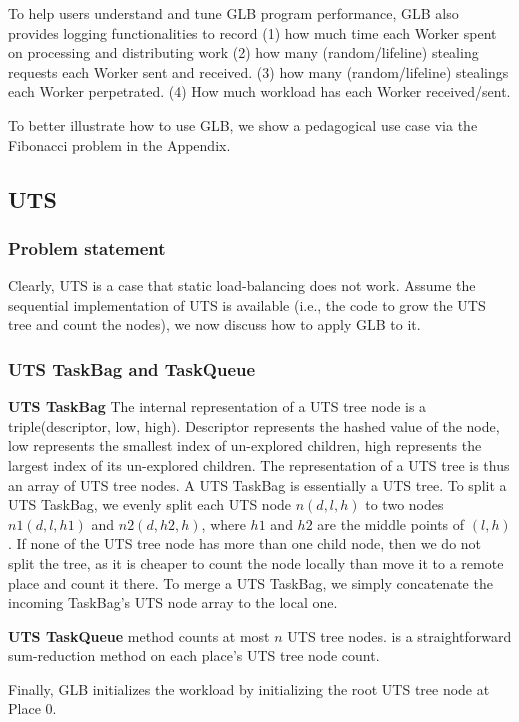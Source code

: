 To help users understand and tune GLB program performance, GLB also provides logging functionalities to record (1) how much time each Worker spent on processing and distributing work (2) how many (random/lifeline) stealing requests each Worker sent and received. (3) how many (random/lifeline) stealings each Worker perpetrated. (4) How much workload has each Worker received/sent.

To better illustrate how to use GLB, we show a pedagogical use case via the Fibonacci problem in the Appendix.



\subsection{UTS}
\label{sec:design:uts}
\subsubsection{Problem statement}

Clearly, UTS is a case that static load-balancing does not work.  Assume the sequential implementation of UTS is available (i.e., the code to grow the UTS tree and count the nodes), we now discuss how to apply GLB to it.
\subsubsection{UTS TaskBag and TaskQueue }
\textbf{UTS TaskBag} The internal representation of a UTS tree node is a triple(descriptor, low, high). Descriptor represents the hashed value of the node, low represents the smallest index of un-explored children, high represents the largest index of its un-explored children. The representation of a UTS tree is thus an array of UTS tree nodes.
 A UTS TaskBag is essentially a UTS tree. To split a UTS TaskBag, we evenly split each UTS node $n(d,l,h)$ to two nodes $n1(d,l,h1)$ and $n2(d,h2,h)$, where $h1$ and $h2$ are the middle points of $(l,h)$.  If none of the UTS tree node has more than one child node, then we do not split the tree, as it is cheaper to count the node locally than move it to a remote place and count it there. To merge a UTS TaskBag, we simply concatenate the incoming TaskBag's UTS node array to the local one.

\textbf{UTS TaskQueue}  method counts at most $n$ UTS tree nodes.  is a straightforward sum-reduction method on each place's UTS tree node count.

Finally, GLB initializes the workload by initializing the root UTS tree node at Place 0.


